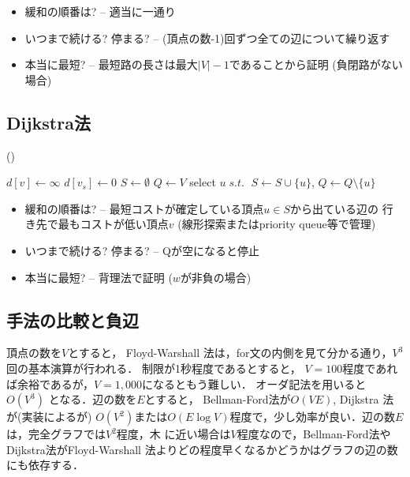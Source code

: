 \begin{itemize}
\setlength{\itemsep}{0pt}
\item 緩和の順番は? -- 適当に一通り
\item いつまで続ける? 停まる? -- (頂点の数-1)回ずつ全ての辺について繰り返す
\item 本当に最短? -- 最短路の長さは最大$|V|-1$であることから証明 (負閉路がない場合)
\end{itemize}

\subsection{Dijkstra法}\label{section:dijkstra}
(\pccbook[p.~96])

\begin{algorithmic}[1]
\State $d[v] \gets \infty$
\EndFor
\State $d[v_s] \gets 0$
\State $S\gets \emptyset$
\State $Q\gets V$ 
\label{alg:dijkstra:while}
\State select $u\; s.t.\; $\label{alg:dijkstra:pop}
\State $S \gets S \cup \{u\}$, $Q \gets Q \setminus \{u\}$
\State {}\label{alg:dijkstra:relax}
\EndFor
\EndWhile
\EndProcedure
\end{algorithmic}

\begin{itemize}
\setlength{\itemsep}{0pt}
\item 緩和の順番は? -- 最短コストが確定している頂点$u\in S$から出ている辺の
  行き先で最もコストが低い頂点$v$ (線形探索またはpriority queue等で管理)
\item いつまで続ける? 停まる? -- Qが空になると停止
\item 本当に最短? -- 背理法で証明 ($w$が非負の場合)
\end{itemize}


\subsection{手法の比較と負辺}
頂点の数を$V$とすると，
Floyd-Warshall 法は，for文の内側を見て分かる通り，$V^3$回の基本演算が行われる．
制限が1秒程度であるとすると，
$V=100$程度であれば余裕であるが，$V=1,000$になるともう難しい．
オーダ記法を用いると$O(V^3)$ となる．辺の数を$E$とすると，
Bellman-Ford法が$O(VE)$, Dijkstra 法が(実装によるが)
$O(V^2)$または$O(E \log V)$程度で，少し効率が良い．辺の数$E$は，完全グラフでは$V^2$程度，木
に近い場合は$V$程度なので，Bellman-Ford法や Dijkstra法がFloyd-Warshall 法よりどの程度早くなるかどうかはグラフの辺の数にも依存する．


